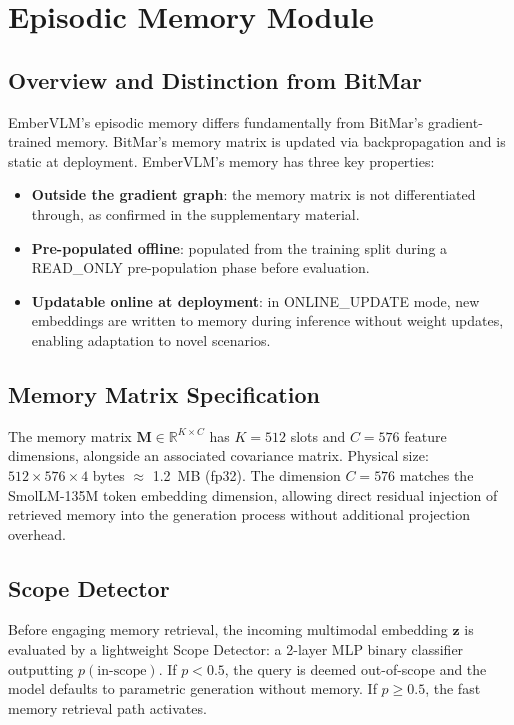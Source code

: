\section{Episodic Memory Module}
\label{sec:embervlm_memory}

\subsection{Overview and Distinction from BitMar}
EmberVLM's episodic memory differs fundamentally from BitMar's gradient-trained memory. BitMar's memory matrix is updated via backpropagation and is static at deployment. EmberVLM's memory has three key properties:
\begin{itemize}
    \item \textbf{Outside the gradient graph}: the memory matrix is not differentiated through, as confirmed in the supplementary material.
    \item \textbf{Pre-populated offline}: populated from the training split during a READ\_ONLY pre-population phase before evaluation.
    \item \textbf{Updatable online at deployment}: in ONLINE\_UPDATE mode, new embeddings are written to memory during inference without weight updates, enabling adaptation to novel scenarios.
\end{itemize}

\subsection{Memory Matrix Specification}
The memory matrix $\mathbf{M} \in \mathbb{R}^{K \times C}$ has $K{=}512$ slots and $C{=}576$ feature dimensions, alongside an associated covariance matrix. Physical size: $512 \times 576 \times 4$ bytes $\approx$ 1.2~MB (fp32). The dimension $C{=}576$ matches the SmolLM-135M token embedding dimension, allowing direct residual injection of retrieved memory into the generation process without additional projection overhead.

\subsection{Scope Detector}
Before engaging memory retrieval, the incoming multimodal embedding $\mathbf{z}$ is evaluated by a lightweight Scope Detector: a 2-layer MLP binary classifier outputting $p(\text{in-scope})$. If $p < 0.5$, the query is deemed out-of-scope and the model defaults to parametric generation without memory. If $p \geq 0.5$, the fast memory retrieval path activates.

